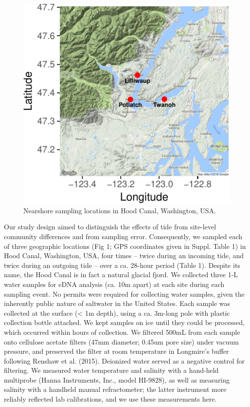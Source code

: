 \documentclass[fleqn,10pt,lineno]{wlpeerj} %
\begin{document}
\begin{figure}[!ht]

{\centering \includegraphics{figures/FIG1_sitemap-1} 

}

\caption{\label{fig:fig1}Nearshore sampling locations in Hood Canal, Washington, USA.}\label{fig:FIG1_sitemap}
\end{figure}

Our study design aimed to distinguish the effects of tide from
site-level community differences and from sampling error. Consequently,
we sampled each of three geographic locations (Fig 1; GPS coordinates
given in Suppl. Table 1) in Hood Canal, Washington, USA, four times --
twice during an incoming tide, and twice during an outgoing tide -- over
a ca. 28-hour period (Table 1). Despite its name, the Hood Canal is in
fact a natural glacial fjord. We collected three 1-L water samples for
eDNA analysis (ca. 10m apart) at each site during each sampling event.
No permits were required for collecting water samples, given the
inherently public nature of saltwater in the United States. Each sample
was collected at the surface (\textless{} 1m depth), using a ca. 3m-long
pole with plastic collection bottle attached. We kept samples on ice
until they could be processed, which occurred within hours of
collection. We filtered 500mL from each sample onto cellulose acetate
filters (47mm diameter; 0.45um pore size) under vacuum pressure, and
preserved the filter at room temperature in Longmire's buffer following
Renshaw et al. (2015). Deionized water served as a negative control for
filtering. We measured water temperature and salinity with a hand-held
multiprobe (Hanna Instruments, Inc., model HI-9828), as well as
measuring salinity with a handheld manual refractometer; the latter
instrument more reliably reflected lab calibrations, and we use these
measurements here.
\end{document}
